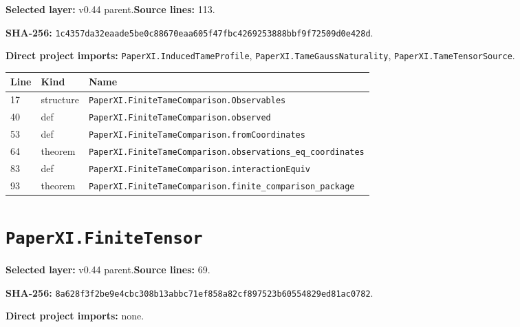 \documentclass[10pt,oneside]{book}
\begin{document}
\textbf{Selected layer:} v0.44 parent.\quad\textbf{Source lines:} 113.\par\textbf{SHA-256:} {\scriptsize\nolinkurl{1c4357da32eaade5be0c88670eaa605f47fbc4269253888bbf9f72509d0e428d}}.


\textbf{Direct project imports:} \nolinkurl{PaperXI.InducedTameProfile}, \nolinkurl{PaperXI.TameGaussNaturality}, \nolinkurl{PaperXI.TameTensorSource}.

\begin{longtable}{@{}p{}p{}p{}@{}}\toprule Line&Kind&Name\\\midrule\endhead

17&structure&\nolinkurl{PaperXI.FiniteTameComparison.Observables}\\

40&def&\nolinkurl{PaperXI.FiniteTameComparison.observed}\\

53&def&\nolinkurl{PaperXI.FiniteTameComparison.fromCoordinates}\\

64&theorem&\nolinkurl{PaperXI.FiniteTameComparison.observations_eq_coordinates}\\

83&def&\nolinkurl{PaperXI.FiniteTameComparison.interactionEquiv}\\

93&theorem&\nolinkurl{PaperXI.FiniteTameComparison.finite_comparison_package}\\

\bottomrule\end{longtable}

\section{\texorpdfstring{\nolinkurl{PaperXI.FiniteTensor}}{PaperXI.FiniteTensor}}\label{module:PaperXI.FiniteTensor}

\textbf{Selected layer:} v0.44 parent.\quad\textbf{Source lines:} 69.\par\textbf{SHA-256:} {\scriptsize\nolinkurl{8a628f3f2be9e4cbc308b13abbc71ef858a82cf897523b60554829ed81ac0782}}.


\textbf{Direct project imports:} none.
\end{document}
